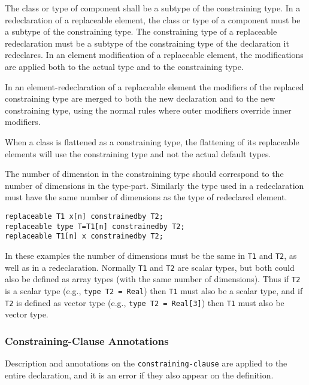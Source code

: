 The class or type of component shall be a subtype of the constraining
type. In a redeclaration of a replaceable element, the class or type of
a component must be a subtype of the constraining type. The constraining
type of a replaceable redeclaration must be a subtype of the
constraining type of the declaration it redeclares. In an element
modification of a replaceable element, the modifications are applied
both to the actual type and to the constraining type.

In an element-redeclaration of a replaceable element the modifiers of
the replaced constraining type are merged to both the new declaration
and to the new constraining type, using the normal rules where outer
modifiers override inner modifiers.

When a class is flattened as a constraining type, the flattening of its
replaceable elements will use the constraining type and not the actual
default types.

The number of dimension in the constraining type should correspond to
the number of dimensions in the type-part. Similarly the type used in a
redeclaration must have the same number of dimensions as the type of
redeclared element.

\begin{example}
\begin{lstlisting}[language=modelica]
replaceable T1 x[n] constrainedby T2;
replaceable type T=T1[n] constrainedby T2;
replaceable T1[n] x constrainedby T2;
\end{lstlisting}
In these examples the number of dimensions must be the same in \lstinline!T1! and \lstinline!T2!, as well as in a redeclaration.  Normally \lstinline!T1! and \lstinline!T2! are scalar types, but both
could also be defined as array types (with the same number of dimensions).  Thus if \lstinline!T2! is a scalar type (e.g., \lstinline!type T2 = Real!) then \lstinline!T1! must also be a scalar type,
and if \lstinline!T2! is defined as vector type (e.g., \lstinline!type T2 = Real[3]!) then \lstinline!T1! must also be vector type.
\end{example}

\subsubsection{Constraining-Clause Annotations}\label{constraining-clause-annotations}

Description and annotations on the \lstinline[language=grammar]!constraining-clause! are applied to the entire declaration, and it is an error if they also appear on the definition.

